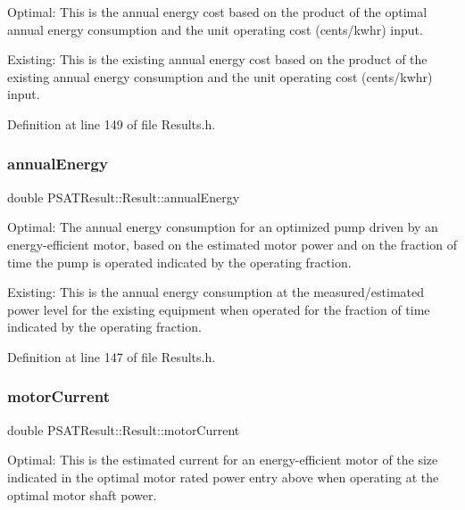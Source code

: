 Optimal\+: This is the annual energy cost based on the product of the optimal annual energy consumption and the unit operating cost (cents/kwhr) input. 

Existing\+: This is the existing annual energy cost based on the product of the existing annual energy consumption and the unit operating cost (cents/kwhr) input. 

Definition at line 149 of file Results.\+h.

\mbox{\label{struct_p_s_a_t_result_1_1_result_aadbf128fb74140ef7117fbac7d3f16e5}} 
\subsubsection{\texorpdfstring{annual\+Energy}{annualEnergy}}
{\footnotesize\ttfamily double P\+S\+A\+T\+Result\+::\+Result\+::annual\+Energy}



Optimal\+: The annual energy consumption for an optimized pump driven by an energy-\/efficient motor, based on the estimated motor power and on the fraction of time the pump is operated indicated by the operating fraction. 

Existing\+: This is the annual energy consumption at the measured/estimated power level for the existing equipment when operated for the fraction of time indicated by the operating fraction. 

Definition at line 147 of file Results.\+h.

\mbox{\label{struct_p_s_a_t_result_1_1_result_a49d9fcc148cd66e507b918dea7435f1d}} 
\subsubsection{\texorpdfstring{motor\+Current}{motorCurrent}}
{\footnotesize\ttfamily double P\+S\+A\+T\+Result\+::\+Result\+::motor\+Current}



Optimal\+: This is the estimated current for an energy-\/efficient motor of the size indicated in the optimal motor rated power entry above when operating at the optimal motor shaft power. 

